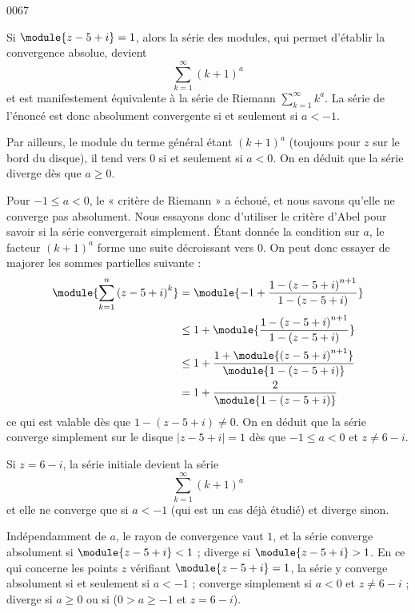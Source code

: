 \begin{corrige}{0067}
\begin{enumerate}
Si $\module{z - 5 + i} = 1$, alors la série des modules, qui permet
d'établir la convergence absolue, devient
\begin{equation*}
\sum_{k=1}^\infty (k+1)^a
\end{equation*}
et est manifestement équivalente à la série de Riemann $\sum_{k=1}^\infty k^a$. La série de l'énoncé est donc absolument convergente si et seulement si $a < -1$.

Par ailleurs, le module du terme général étant ${(k+1)}^a$ (toujours pour $z$ sur le bord du disque), il tend vers $0$ si et seulement si $a < 0$. On en déduit que la série diverge dès que $a\geq 0$.

Pour $-1 \leq a < 0$, le « critère de Riemann » a échoué, et nous savons qu'elle ne converge pas absolument. Nous essayons donc d'utiliser le critère d'Abel pour savoir si la série convergerait simplement. Étant donnée la condition sur $a$, le facteur ${(k+1)}^a$ forme une suite décroissant vers $0$. On peut donc essayer de majorer les sommes partielles suivante :
\begin{equation*}
\begin{split}
\module{\sum_{k=1}^n {(z- 5 + i)}^k} &= \module{-1 + \frac{1 -
{(z- 5 + i)}^{n+1}}{1 - (z - 5 + i)}} \\
&\leq 1+ \module{\frac{1 -
{(z- 5 + i)}^{n+1}}{1 - (z - 5 + i)}} \\
&\leq 1 + \frac{1 + \module{{(z - 5 + i)}^{n+1}}}{\module{1 - (z
- 5 + i)}}\\
&= 1 + \frac2{\module{1 - (z - 5 + i)}}
\end{split}
\end{equation*}
ce qui est valable dès que $1 - (z - 5 + i) \neq 0$. On en déduit que la série converge simplement sur le disque $| z-5+i |=1$ dès que $-1\leq a < 0$ et $z \neq 6-i$.

Si $z = 6 - i$, la série initiale devient la série
\begin{equation*}
	\sum_{k=1}^\infty {(k+1)}^a
\end{equation*}
et elle ne converge que si $a < -1$ (qui est un cas déjà étudié) et
diverge sinon.

\conclusion 
	Indépendamment de $a$, le rayon de convergence vaut $1$, et la série converge absolument si $\module{z - 5 + i}<1$ ; diverge si $\module{z - 5 + i}>1$. En ce qui concerne les points $z$ vérifiant $\module{z - 5 + i}=1$, la série y converge absolument si et seulement si $a < -1$ ; converge simplement si $a < 0$ et $z \neq 6-i$ ; diverge si $a \geq 0$ ou si ($0 > a \geq -1$ et $z = 6-i$).


\end{enumerate}
\end{corrige}
